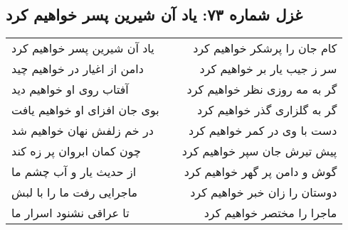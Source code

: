 \begin{center}
\section*{غزل شماره ۷۳: یاد آن شیرین پسر خواهیم کرد}
\label{sec:073}
\begin{longtable}{l p{0.5cm} r}
یاد آن شیرین پسر خواهیم کرد
&&
کام جان را پرشکر خواهیم کرد
\\
دامن از اغیار در خواهیم چید
&&
سر ز جیب یار بر خواهیم کرد
\\
آفتاب روی او خواهیم دید
&&
گر به مه روزی نظر خواهیم کرد
\\
بوی جان افزای او خواهیم یافت
&&
گر به گلزاری گذر خواهیم کرد
\\
در خم زلفش نهان خواهیم شد
&&
دست با وی در کمر خواهیم کرد
\\
چون کمان ابروان پر زه کند
&&
پیش تیرش جان سپر خواهیم کرد
\\
از حدیث یار و آب چشم ما
&&
گوش و دامن پر گهر خواهیم کرد
\\
ماجرایی رفت ما را با لبش
&&
دوستان را زان خبر خواهیم کرد
\\
تا عراقی نشنود اسرار ما
&&
ماجرا را مختصر خواهیم کرد
\\
\end{longtable}
\end{center}
